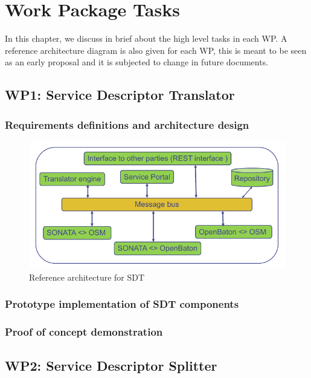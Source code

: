 \chapter{Work Package Tasks}
\label{ch:wptasks}

In this chapter, we discuss in brief about the high level tasks in each WP. A reference architecture diagram is also given for each WP, this is meant to be seen as an early proposal and it is subjected to change in future documents.

\section{WP1: Service Descriptor Translator}

\subsection{Requirements definitions and architecture design}

\begin{figure}[h]
	\centering
	\includegraphics[width=0.9\linewidth]{figures/wp1Arch}
	\caption{Reference architecture for SDT}
	\label{fig:wp1arch}
\end{figure}

\subsection{Prototype implementation of SDT components}
\subsection{Proof of concept demonstration}

\section{WP2: Service Descriptor Splitter}


